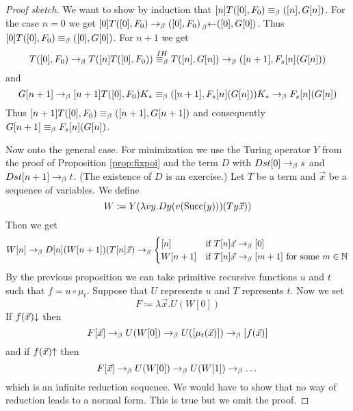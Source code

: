 \begin{proof}[Proof sketch]
We want to show by induction that $[n]T([0], F_0) \equiv_{\beta} ([n], G[n])$.
For the case $n = 0$ we get $[0]T([0], F_0) \to_{\beta} ([0], F_0) \prescript{}{\beta}{\leftarrow} ([0], G[0])$.
Thus $[0]T([0], F_0) \equiv_{\beta} ([0], G[0])$.
For $n + 1$ we get
\begin{equation*}
    [n + 1]T([0], F_0) \bered T([n]T([0], F_0)) \stackrel{IH}{\beq} T([n], G[n]) \bered ([n + 1], F_s [n](G[n]))
\end{equation*}
and
\begin{equation*}
    G[n + 1] \to_{\beta} [n + 1]T([0], F_0)K_*  \equiv_{\beta} ([n + 1], F_s [n](G[n]))K_* \to_{\beta} F_s[n](G[n])
\end{equation*}
Thus $[n + 1]T([0], F_0) \equiv_{\beta} ([n + 1], G[n + 1])$ and consequently $G[n + 1] \equiv_{\beta} F_s [n](G[n])$.

\hfill

Now onto the general case.
For minimization we use the Turing operator $Y$ from the proof of Proposition \ref{prop:fixpoi} and the term $D$ with $Dst[0] \to_{\beta} s$ and $Dst[n + 1] \to_{\beta} t$.
(The existence of $D$ is an exercise.)
Let $T$ be a term and $\vec{x}$ be a sequence of variables.
We define
\begin{equation*}
    W \coloneq Y (\lambda vy. Dy (v (\operatorname{Succ}(y)))(Ty \vec{x}))
\end{equation*}
Then we get
\begin{equation*}
    W[n] \to_{\beta} D[n](W[n + 1])(T[n]\vec{x}) \to_{\beta}
    \begin{cases}
        [n] & \text{if } T[n]\vec{x} \to_{\beta} [0] \\
        W[n + 1] & \text{if } T[n] \vec{x} \to_{\beta} [m + 1] \text{ for some } m \in \mathbb{N}
    \end{cases}
\end{equation*}
By the previous proposition we can take primitive recursive functions $u$ and $t$ such that $f = u \circ \mu_t$.
Suppose that $U$ represents $u$ and $T$ represents $t$.
Now we set
\begin{equation*}
    F \coloneq \lambda \vec{x}. U (W[0])
\end{equation*}
If $f(\vec{x}){\downarrow}$ then
\begin{equation*}
    F[\vec{x}] \to_{\beta} U(W[0]) \to_{\beta} U([\mu_t(\vec{x})]) \to_{\beta} [f(\vec{x})]
\end{equation*}
and if $f(\vec{x}){\uparrow}$ then
\begin{equation*}
    F[\vec{x}] \to_{\beta} U(W[0]) \to_{\beta} U(W[1]) \to_{\beta} \dots
\end{equation*}
which is an infinite reduction sequence.
We would have to show that no way of reduction leads to a normal form.
This is true but we omit the proof.
\end{proof}


